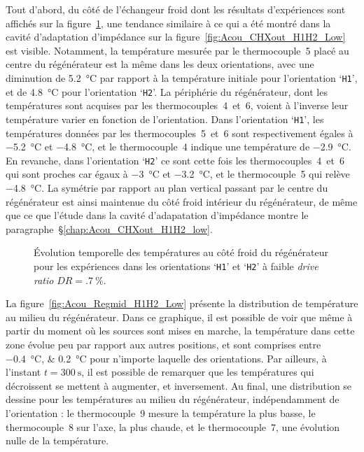 Tout d'abord, du côté de l'échangeur froid dont les résultats d'expériences sont affichés sur la figure~\ref{fig:Acou_CHXin_H1H2_Low}, une tendance similaire à ce qui a été montré dans la cavité d'adaptation d'impédance sur la figure~\ref{fig:Acou_CHXout_H1H2_Low} est visible. Notamment, la température mesurée par le thermocouple~5 placé au centre du régénérateur est la même dans les deux orientations, avec une diminution de \qty{5.2}{\degreeCelsius} par rapport à la température initiale pour l'orientation `\texttt{H1}', et de \qty{4.8}{\degreeCelsius} pour l'orientation `\texttt{H2}'. La périphérie du régénérateur, dont les températures sont acquises par les thermocouples~4~et~6, voient à l'inverse leur température varier en fonction de l'orientation. Dans l'orientation `\texttt{H1}', les températures données par les thermocouples~5~et~6 sont respectivement égales à \qty{-5.2}{\degreeCelsius} et \qty{-4.8}{\degreeCelsius}, et le thermocouple~4 indique une température de \qty{-2.9}{\degreeCelsius}. En revanche, dans l'orientation `\texttt{H2}' ce sont cette fois les thermocouples~4~et~6 qui sont proches car égaux à \qty{-3}{\degreeCelsius} et \qty{-3.2}{\degreeCelsius}, et le thermocouple~5 qui relève \qty{-4.8}{\degreeCelsius}. La symétrie par rapport au plan vertical passant par le centre du régénérateur est ainsi maintenue du côté froid intérieur du régénérateur, de même que ce que l'étude dans la cavité d'adapatation d'impédance montre le paragraphe~§\ref{chap:Acou_CHXout_H1H2_low}.

\begin{figure}[!ht]
    \centering
    
    \caption{\'Evolution temporelle des températures au côté froid du régénérateur pour les expériences dans les orientations `\texttt{H1}' et `\texttt{H2}' à faible \textit{drive ratio} $DR=\qty{.7}{\percent}$.}
    \label{fig:Acou_CHXin_H1H2_Low}
\end{figure}

La figure~\ref{fig:Acou_Regmid_H1H2_Low} présente la distribution de température au milieu du régénérateur. Dans ce graphique, il est possible de voir que même à partir du moment où les sources sont mises en marche, la température dans cette zone évolue peu par rapport aux autres positions, et sont comprises entre \qtylist{-.4;.2}{\degreeCelsius} pour n'importe laquelle des orientations. Par ailleurs, à l'instant $t=\qty{300}{\second}$, il est possible de remarquer que les températures qui décroissent se mettent à augmenter, et inversement. Au final, une distribution se dessine pour les températures au milieu du régénérateur,  indépendamment de l'orientation : le thermocouple~9 mesure la température la plus basse, le thermocouple~8 sur l'axe, la plus chaude, et le thermocouple~7, une évolution nulle de la température. 

